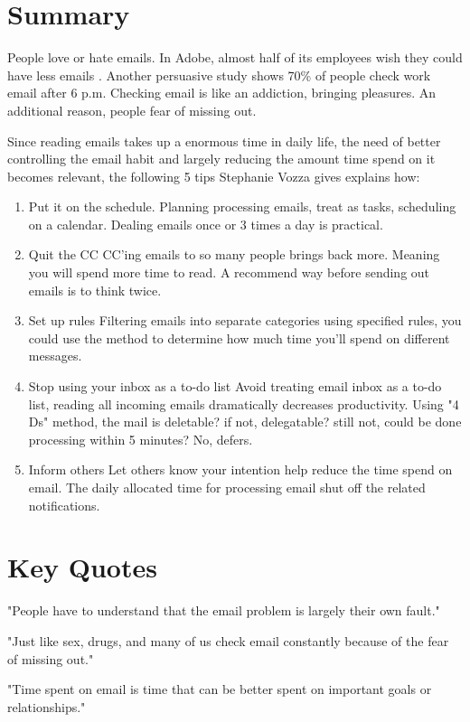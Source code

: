 \documentclass[fleqn,10pt]{SelfArx} %
\begin{document}
\section*{Summary}
\begin{flushleft}
People love or hate emails. In Adobe, almost half of its employees wish they could have less emails . Another persuasive study shows 70\% of people check work email after 6 p.m. Checking email is like an addiction, bringing pleasures. An additional reason, people fear of missing out. 
\par Since reading emails takes up a enormous time in daily life, the need of better controlling the email habit and largely reducing the amount time spend on it becomes relevant, the following 5 tips Stephanie Vozza gives explains how: 
\end{flushleft}

\begin{enumerate}

\item Put it on the schedule. 
Planning processing emails, treat as tasks,  scheduling on a calendar. Dealing emails once or 3 times a day is practical. 

\item Quit the CC
CC'ing emails to so many people brings back more. Meaning you will spend more time to read. A recommend way before sending out emails is to think twice. 

\item Set up rules
Filtering emails into separate categories using specified rules, you could use the method to determine how much time you'll spend on different messages.     

\item Stop using your inbox as a to-do list
Avoid treating email inbox as a to-do list, reading all incoming emails dramatically decreases productivity. Using "4 Ds" method, the mail is deletable? if not, delegatable? still not, could be done processing within 5 minutes? No, defers. 

\item Inform others
Let others know your intention help reduce the time spend on email. The daily allocated time for processing email shut off the related notifications.
\end{enumerate}

\section*{Key Quotes}
\begin{description}
\item "People have to understand that the email problem is largely their own fault."

\item "Just like sex, drugs, and many of us check email constantly because of the fear of missing out."

\item "Time spent on email is time that can be better spent on important goals or relationships." 
\end{description}

\end{document}
